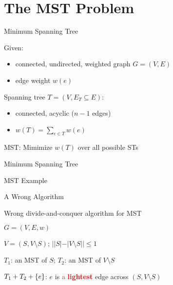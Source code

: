 \section{The MST Problem}	\label{section:mst-problem}

\begin{frame}{Minimum Spanning Tree}
  \begin{definition}[MST]
	Given:
	\begin{itemize}
	  \item connected, undirected, weighted graph $G = (V, E)$
	  \item edge weight $w(e)$
	\end{itemize}
    
	\pause
	\vspace{0.30cm}

	Spanning tree $T = (V, E_{T} \subseteq E)$:
	\begin{itemize}
	  \item connected, acyclic \pause ($n-1$ edges)
		\pause
	  \item $w(T) = \sum_{e \in T} w(e)$
	\end{itemize}

	\pause
	\vspace{0.80cm}
	\centerline{MST: Mimimize $w(T)$ over all possible STs}
  \end{definition}
\end{frame}
\begin{frame}{Minimum Spanning Tree}
  \begin{exampleblock}{MST Example}
  \end{exampleblock}
\end{frame}
\begin{frame}{A Wrong Algorithm}
  \begin{exampleblock}{Wrong divide-and-conquer algorithm for MST}
    \begin{description}
	  \item[Input:] $G = (V, E, w)$
	  \item[Divide:] $V = (S, V \setminus S)$; $||S| - |V \setminus S|| \le 1$ \uncover<2->{\textcolor{red}{(Cut)}}
	  \item<3->[Conquer:] $T_1$: an MST of $S$; $T_2$: an MST of $V \setminus S$
	  \item<4->[Combine:] $T_{1} + T_{2} + \{e\}$: $e$ is \textcolor{brown}{a} \textcolor{red}{\bf lightest} edge across $(S, V \setminus S)$
    \end{description}
  \end{exampleblock}

  \pause
  \vspace{0.50cm}

\end{frame}
